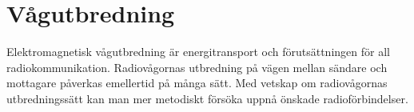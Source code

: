 \chapter{Vågutbredning}
\label{vågutbredning}

Elektromagnetisk vågutbredning är energitransport och förutsättningen för all
radiokommunikation.
Radiovågornas utbredning på vägen mellan sändare och mottagare påverkas
emellertid på många sätt.
Med vetskap om radiovågornas utbredningssätt kan man mer metodiskt försöka uppnå
önskade radioförbindelser.
